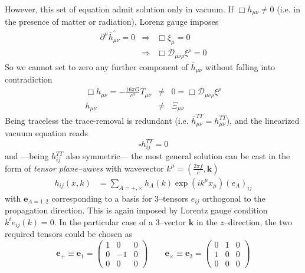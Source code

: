However, this set of equation admit solution only in vacuum. If $\Box\bar{h}_{\mu\nu}\neq0$ (i.e. in the presence of matter or radiation), Lorenz gauge imposes
\begin{eqnarray}
	\partial^{\mu}\bar{h}_{\mu\nu}^{\prime}=0 & \Rightarrow & \Box\xi_{\mu}=0\\
	& \Rightarrow & \Box\mathcal{D}_{\mu\nu\rho}\xi^{\rho}=0
\end{eqnarray}
So we cannot set to zero any further component of $\bar{h}_{\mu\nu}$ without falling into contradiction
\begin{eqnarray}
	\Box h_{\mu\nu}=-\frac{16\pi G}{c^{4}}T_{\mu\nu} & \neq & 0=\Box\mathcal{D}_{\mu\nu\rho}\xi^{\rho}\\
	 h_{\mu\nu} & \neq & \Xi_{\mu\nu}
\end{eqnarray}
Being traceless the trace-removal is redundant (i.e. $\overline{h}_{\mu\nu}^{TT}=h_{\mu\nu}^{TT}$), and the linearized vacuum equation reads
\begin{equation}
	\square h_{ij}^{TT}=0\label{eq:linearEE_TTgauge}
\end{equation}
and ---being $h_{ij}^{TT}$ also symmetric--- the most general solution
can be cast in the form of \emph{tensor plane--waves} with wavevector
$k^{\mu}=\left(\frac{2\pi f}{c},\boldsymbol{k}\right)$
\begin{align}
	h_{ij}\left(x,k\right) & =\sum_{A=+,\times}h_{A}(k)\exp(ik^{\mu}x_{\mu})(e_{A})_{ij}\label{eq:vacuumsolution}
\end{align}
with $\boldsymbol{e}_{A=1,2}$ corresponding to a basis for \ttg
$3$--tensors $e_{ij}$ orthogonal to the propagation direction. This is again imposed by Lorentz gauge condition $k^{i}e_{ij}(k)=0$. 
In the particular case of a $3$--vector $\boldsymbol{k}$ in the $z$--direction, the
two required tensors could be chosen as
\begin{equation}
\boldsymbol{e}_{+}\equiv\boldsymbol{e}_{1}=\left(\begin{array}{ccc}
	1 & 0 & 0\\
	0 & -1 & 0\\
	0 & 0 & 0
\end{array}\right)\qquad\boldsymbol{e}_{\times}\equiv\boldsymbol{e}_{2}=\left(\begin{array}{ccc}
	0 & 1 & 0\\
	1 & 0 & 0\\
	0 & 0 & 0
\end{array}\right)
\end{equation}

